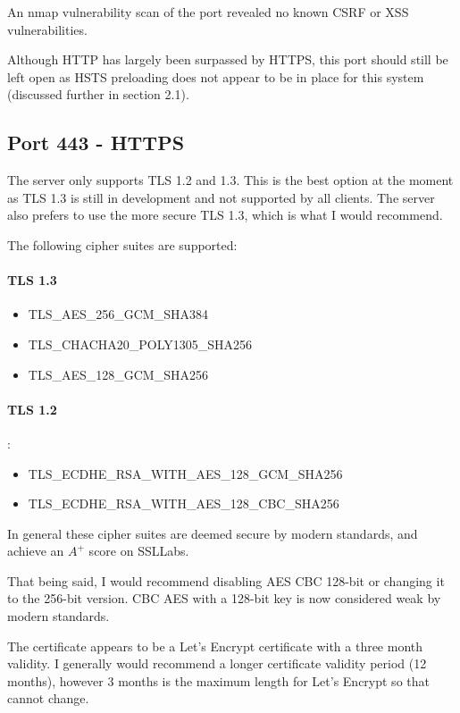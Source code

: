 \documentclass[12pt]{article}
\begin{document}
  An nmap vulnerability scan of the port revealed no known CSRF or XSS vulnerabilities.

  Although HTTP has largely been surpassed by HTTPS, this port should still be left open as HSTS preloading does not appear to be in place for this system (discussed further in section 2.1).

  \subsection{Port 443 - HTTPS}
  The server only supports TLS 1.2 and 1.3.
  This is the best option at the moment as TLS 1.3 is still in development and not supported by all clients.
  The server also prefers to use the more secure TLS 1.3, which is what I would recommend.
  
  The following cipher suites are supported:
  \paragraph{TLS 1.3}
  \begin{itemize}
    \item TLS\_AES\_256\_GCM\_SHA384
    \item TLS\_CHACHA20\_POLY1305\_SHA256
    \item TLS\_AES\_128\_GCM\_SHA256
  \end{itemize}
  \paragraph{TLS 1.2}:
  \begin{itemize}
    \item TLS\_ECDHE\_RSA\_WITH\_AES\_128\_GCM\_SHA256
    \item TLS\_ECDHE\_RSA\_WITH\_AES\_128\_CBC\_SHA256
  \end{itemize}

  In general these cipher suites are deemed secure by modern standards, and achieve an $A^+$ score on SSLLabs.

  That being said, I would recommend disabling AES CBC 128-bit or changing it to the 256-bit version.
  CBC AES with a 128-bit key is now considered weak by modern standards.

  The certificate appears to be a Let's Encrypt certificate with a three month validity.
  I generally would recommend a longer certificate validity period (12 months), however 3 months is the maximum length for Let's Encrypt so that cannot change.
\end{document}

